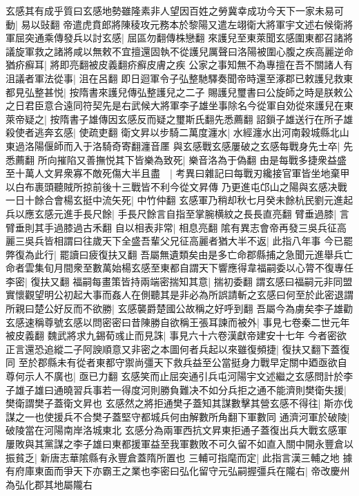 玄感其有成乎質曰玄感地勢雖隆素非人望因百姓之勞冀幸成功今天下一家未易可動|{
	易以䜴翻}
帝遣虎賁郎將陳稜攻元務本於黎陽又遣左翊衛大將軍宇文述右候衛將軍屈突通乘傳發兵以討玄感|{
	屈區勿翻傳株戀翻}
來護兒至東萊聞玄感圍東都召諸將議旋軍救之諸將咸以無敕不宜擅還固執不從護兒厲聲曰洛陽被圍心腹之疾高麗逆命猶疥癬耳|{
	將即亮翻被皮義翻疥癬皮膚之疾}
公家之事知無不為專擅在吾不關諸人有沮議者軍法從事|{
	沮在呂翻}
即日迴軍令子弘整馳驛奏聞帝時還至涿郡已敕護兒救東都見弘整甚悦|{
	按隋書來護兒傳弘整護兒之二子}
賜護兒璽書曰公旋師之時是朕敕公之日君臣意合遠同符契先是右武候大將軍李子雄坐事除名今從軍自効從來護兒在東萊帝疑之|{
	按隋書子雄傳因玄感反而疑之璽斯氏翻先悉薦翻}
詔鎻子雄送行在所子雄殺使者逃奔玄感|{
	使疏吏翻}
衛文昇以步騎二萬度瀍水|{
	水經瀍水出河南穀城縣北山東過洛陽偃師而入于洛騎奇寄翻瀍音㕓}
與玄感戰玄感屢破之玄感每戰身先士卒|{
	先悉薦翻}
所向摧陷又善撫悦其下皆樂為致死|{
	樂音洛為于偽翻}
由是每戰多捷衆益盛至十萬人文昇衆寡不敵死傷大半且盡　|{
	考異曰雜記曰每戰刃纔接官軍皆坐地棄甲以白布裹頭聽賊所掠前後十三戰皆不利今從文昇傳}
乃更進屯邙山之陽與玄感决戰一日十餘合會楊玄挺中流矢死|{
	中竹仲翻}
玄感軍乃稍却秋七月癸未餘杭民劉元進起兵以應玄感元進手長尺餘|{
	手長尺餘言自指至掌腕横紋之長長直亮翻}
臂垂過膝|{
	言臂垂則其手過膝過古禾翻}
自以相表非常|{
	相息亮翻}
隂有異志會帝再發三吳兵征高麗三吳兵皆相謂曰往歲天下全盛吾輩父兄征高麗者猶大半不返|{
	此指八年事}
今已罷弊復為此行|{
	罷讀曰疲復扶又翻}
吾屬無遺類矣由是多亡命郡縣捕之急聞元進舉兵亡命者雲集旬月間衆至數萬始楊玄感至東都自謂天下響應得韋福嗣委以心膂不復專任李密|{
	復扶又翻}
福嗣每畫策皆持兩端密揣知其意|{
	揣初委翻}
謂玄感曰福嗣元非同盟實懷觀望明公初起大事而姦人在側聽其是非必為所誤請斬之玄感曰何至於此密退謂所親曰楚公好反而不欲勝|{
	玄感襲爵楚國公故稱之好呼到翻}
吾屬今為虜矣李子雄勸玄感速稱尊號玄感以問密密曰昔陳勝自欲稱王張耳諫而被外|{
	事見七卷秦二世元年被皮義翻}
魏武將求九錫荀彧止而見誅|{
	事見六十六卷漢獻帝建安十七年}
今者密欲正言還恐追縱二子阿諛順意又非密之本圖何者兵起以來雖復頻捷|{
	復扶又翻下蓋復同}
至於郡縣未有從者東都守禦尚彊天下救兵益至公當挺身力戰早定關中廼亟欲自尊何示人不廣也|{
	亟已力翻}
玄感笑而止屈突通引兵屯河陽宇文述繼之玄感問計於李子雄子雄曰通曉習兵事若一得度河則勝負難决不如分兵拒之通不能濟則樊衛失援|{
	樊衛謂樊子蓋衛文昇也}
玄感然之將拒通樊子蓋知其謀數擊其營玄感不得往|{
	斯亦伐謀之一也使援兵不合樊子蓋堅守都城兵何由解數所角翻下軍數同}
通濟河軍於破陵|{
	破陵當在河陽南岸洛城東北}
玄感分為兩軍西抗文昇東拒通子蓋復出兵大戰玄感軍屢敗與其黨謀之李子雄曰東都援軍益至我軍數敗不可久留不如直入關中開永豐倉以振貧乏|{
	新唐志華隂縣有永豐倉蓋隋所置也}
三輔可指麾而定|{
	此指言漢三輔之地}
據有府庫東面而爭天下亦霸王之業也李密曰弘化留守元弘嗣握彊兵在隴右|{
	帝改慶州為弘化郡其地屬隴右}
